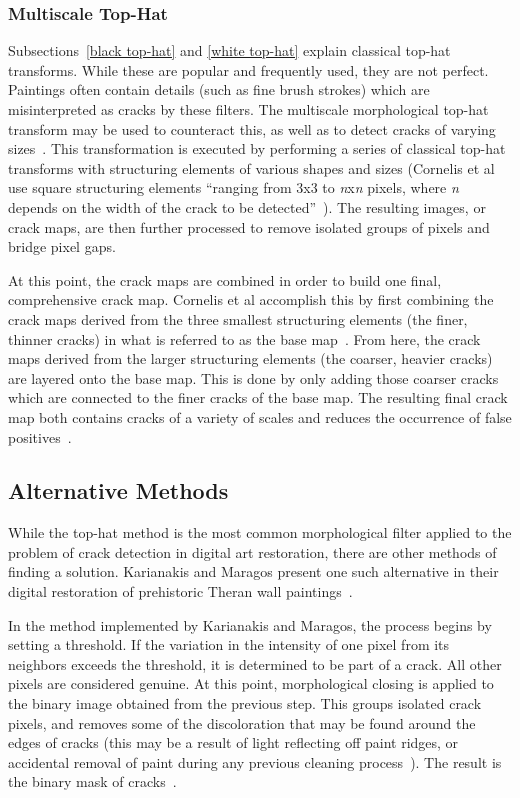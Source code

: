 \documentclass{sig-alternate}
\begin{document}
\subsubsection{Multiscale Top-Hat}\label{multiscale top-hat}
Subsections~\ref{black top-hat} and \ref{white top-hat} explain classical top-hat transforms. While these are popular and frequently used, they are not perfect. Paintings often contain details (such as fine brush strokes) which are misinterpreted as cracks by these filters. The multiscale morphological top-hat transform may be used to counteract this, as well as to detect cracks of varying sizes~\cite{Altarpiece:2013}. This transformation is executed by performing a series of classical top-hat transforms with structuring elements of various shapes and sizes (Cornelis et al use square structuring elements ``ranging from 3x3 to \textit{n}x\textit{n} pixels, where \textit{n} depends on the width of the crack to be detected''~\cite{Altarpiece:2013}). The resulting images, or crack maps, are then further processed to remove isolated groups of pixels and bridge pixel gaps.

At this point, the crack maps are combined in order to build one final, comprehensive crack map. Cornelis et al accomplish this by first combining the crack maps derived from the three smallest structuring elements (the finer, thinner cracks) in what is referred to as the base map~\cite{Altarpiece:2013}. From here, the crack maps derived from the larger structuring elements (the coarser, heavier cracks) are layered onto the base map. This is done by only adding those coarser cracks which are connected to the finer cracks of the base map. The resulting final crack map both contains cracks of a variety of scales and reduces the occurrence of false positives~\cite{Altarpiece:2013}.

\subsection{Alternative Methods}\label{alternative}
While the top-hat method is the most common morphological filter applied to the problem of crack detection in digital art restoration, there are other methods of finding a solution. Karianakis and Maragos present one such alternative in their digital restoration of prehistoric Theran wall paintings~\cite{Theran:2013}.

In the method implemented by Karianakis and Maragos, the process begins by setting a threshold. If the variation in the intensity of one pixel from its neighbors exceeds the threshold, it is determined to be part of a crack. All other pixels are considered genuine. At this point, morphological closing is applied to the binary image obtained from the previous step. This groups isolated crack pixels, and removes some of the discoloration that may be found around the edges of cracks (this may be a result of light reflecting off paint ridges, or accidental removal of paint during any previous cleaning process~\cite{Altarpiece:2013}). The result is the binary mask of cracks~\cite{Theran:2013}.
\end{document}
